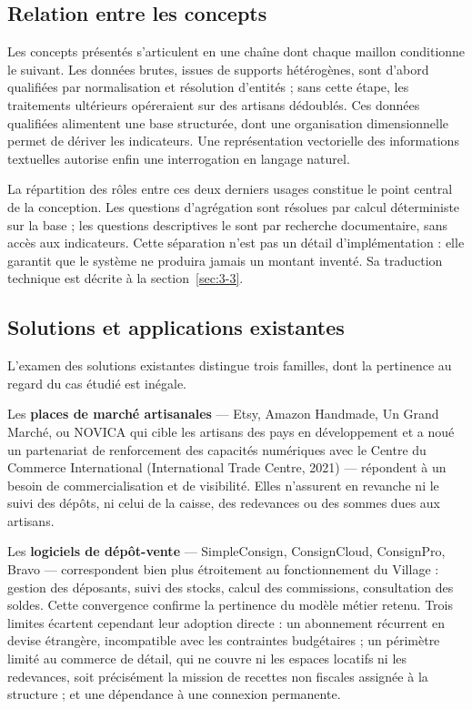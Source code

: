 \subsection{Relation entre les concepts}
\label{sec:1-2-2}

Les concepts présentés s'articulent en une chaîne dont chaque maillon conditionne le suivant. Les données brutes, issues de supports hétérogènes, sont d'abord qualifiées par normalisation et résolution d'entités ; sans cette étape, les traitements ultérieurs opéreraient sur des artisans dédoublés. Ces données qualifiées alimentent une base structurée, dont une organisation dimensionnelle permet de dériver les indicateurs. Une représentation vectorielle des informations textuelles autorise enfin une interrogation en langage naturel.

La répartition des rôles entre ces deux derniers usages constitue le point central de la conception. Les questions d'agrégation sont résolues par calcul déterministe sur la base ; les questions descriptives le sont par recherche documentaire, sans accès aux indicateurs. Cette séparation n'est pas un détail d'implémentation : elle garantit que le système ne produira jamais un montant inventé. Sa traduction technique est décrite à la section~\ref{sec:3-3}.

\subsection{Solutions et applications existantes}

L'examen des solutions existantes distingue trois familles, dont la pertinence au regard du cas étudié est inégale.

Les \textbf{places de marché artisanales} --- Etsy, Amazon Handmade, Un Grand Marché, ou NOVICA qui cible les artisans des pays en développement et a noué un partenariat de renforcement des capacités numériques avec le Centre du Commerce International (International Trade Centre, 2021) --- répondent à un besoin de commercialisation et de visibilité. Elles n'assurent en revanche ni le suivi des dépôts, ni celui de la caisse, des redevances ou des sommes dues aux artisans.

Les \textbf{logiciels de dépôt-vente} --- SimpleConsign, ConsignCloud, ConsignPro, Bravo --- correspondent bien plus étroitement au fonctionnement du Village : gestion des déposants, suivi des stocks, calcul des commissions, consultation des soldes. Cette convergence confirme la pertinence du modèle métier retenu. Trois limites écartent cependant leur adoption directe : un abonnement récurrent en devise étrangère, incompatible avec les contraintes budgétaires ; un périmètre limité au commerce de détail, qui ne couvre ni les espaces locatifs ni les redevances, soit précisément la mission de recettes non fiscales assignée à la structure ; et une dépendance à une connexion permanente.

